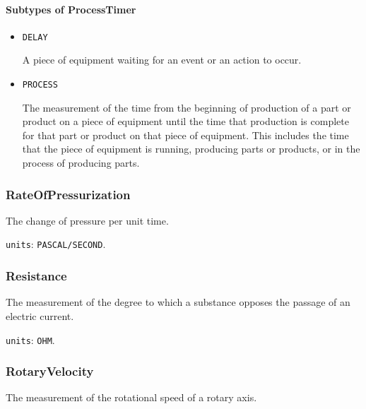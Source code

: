 \paragraph{Subtypes of ProcessTimer}\mbox{}
\label{sec:Subtypes of ProcessTimer}

\begin{itemize}

\item \texttt{DELAY}


A piece of equipment waiting for an event or an action to occur.

\item \texttt{PROCESS}


The measurement of the time from the beginning of production of a part or product on a piece of equipment until the time that production is complete for that part or product on that piece of equipment.  This includes the time that the piece of equipment is running, producing parts or products, or in the process of producing parts.


\end{itemize}





\subsubsection{RateOfPressurization}
\label{sec:RateOfPressurization}



The change of pressure per unit time.


\texttt{units}: \texttt{PASCAL/SECOND}.


\subsubsection{Resistance}
\label{sec:Resistance}



The measurement of the degree to which a substance opposes the passage of an electric current.


\texttt{units}: \texttt{OHM}.


\subsubsection{RotaryVelocity}
\label{sec:RotaryVelocity}



The measurement of the rotational speed of a rotary axis.


